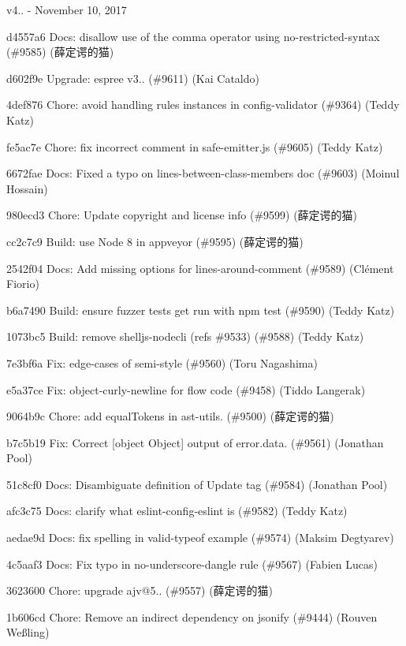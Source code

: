v4.. -\/ November 10, 2017


\begin{DoxyItemize}
\item d4557a6 Docs\+: disallow use of the comma operator using no-\/restricted-\/syntax (\#9585) (薛定谔的猫)
\item d602f9e Upgrade\+: espree v3.. (\#9611) (Kai Cataldo)
\item 4def876 Chore\+: avoid handling rules instances in config-\/validator (\#9364) (Teddy Katz)
\item fe5ac7e Chore\+: fix incorrect comment in safe-\/emitter.\+js (\#9605) (Teddy Katz)
\item 6672fae Docs\+: Fixed a typo on lines-\/between-\/class-\/members doc (\#9603) (Moinul Hossain)
\item 980ecd3 Chore\+: Update copyright and license info (\#9599) (薛定谔的猫)
\item cc2c7c9 Build\+: use Node 8 in appveyor (\#9595) (薛定谔的猫)
\item 2542f04 Docs\+: Add missing options for {\ttfamily lines-\/around-\/comment} (\#9589) (Clément Fiorio)
\item b6a7490 Build\+: ensure fuzzer tests get run with {\ttfamily npm test} (\#9590) (Teddy Katz)
\item 1073bc5 Build\+: remove shelljs-\/nodecli (refs \#9533) (\#9588) (Teddy Katz)
\item 7e3bf6a Fix\+: edge-\/cases of semi-\/style (\#9560) (Toru Nagashima)
\item e5a37ce Fix\+: object-\/curly-\/newline for flow code (\#9458) (Tiddo Langerak)
\item 9064b9c Chore\+: add equal\+Tokens in ast-\/utils. (\#9500) (薛定谔的猫)
\item b7c5b19 Fix\+: Correct \mbox{[}object Object\mbox{]} output of error.\+data. (\#9561) (Jonathan Pool)
\item 51c8cf0 Docs\+: Disambiguate definition of Update tag (\#9584) (Jonathan Pool)
\item afc3c75 Docs\+: clarify what eslint-\/config-\/eslint is (\#9582) (Teddy Katz)
\item aedae9d Docs\+: fix spelling in valid-\/typeof example (\#9574) (Maksim Degtyarev)
\item 4c5aaf3 Docs\+: Fix typo in no-\/underscore-\/dangle rule (\#9567) (Fabien Lucas)
\item 3623600 Chore\+: upgrade ajv@5.. (\#9557) (薛定谔的猫)
\item 1b606cd Chore\+: Remove an indirect dependency on jsonify (\#9444) (Rouven Weßling)

\end{DoxyItemize}
